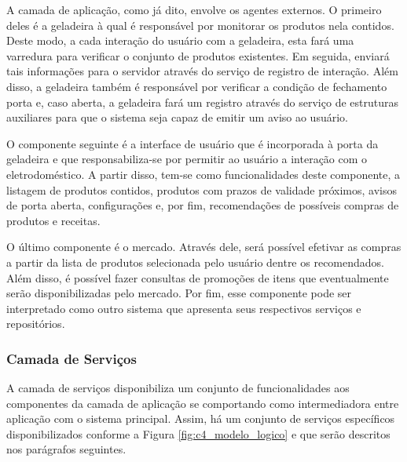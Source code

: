 
A camada de aplicação, como já dito, envolve os agentes externos. O primeiro deles é a geladeira à qual é responsável por monitorar os produtos nela contidos. Deste modo, a cada interação do usuário com a geladeira, esta fará uma varredura para verificar o conjunto de produtos existentes. Em seguida, enviará tais informações para o servidor através do serviço de registro de interação. Além disso, a geladeira também é responsável por verificar a condição de fechamento porta e, caso aberta, a geladeira fará um registro através do serviço de estruturas auxiliares para que o sistema seja capaz de emitir um aviso ao usuário.


O componente seguinte é a interface de usuário que é incorporada à porta da geladeira e que responsabiliza-se por permitir ao usuário a interação com o eletrodoméstico. A partir disso, tem-se como funcionalidades deste componente, a listagem de produtos contidos, produtos com prazos de validade próximos, avisos de porta aberta, configurações e, por fim, recomendações de possíveis compras de produtos e receitas.


O último componente é o mercado. Através dele, será possível efetivar as compras a partir da lista de produtos selecionada pelo usuário dentre os recomendados. Além disso, é possível fazer consultas de promoções de itens que eventualmente serão disponibilizadas pelo mercado. Por fim, esse componente pode ser interpretado como outro sistema que apresenta seus respectivos serviços e repositórios.

\subsubsection{Camada de Serviços}

A camada de serviços disponibiliza um conjunto de funcionalidades aos componentes da camada de aplicação se comportando como intermediadora entre aplicação com o sistema principal. Assim, há um conjunto de serviços específicos disponibilizados conforme a Figura \ref{fig:c4_modelo_logico} e que serão descritos nos parágrafos seguintes.

